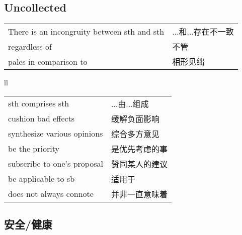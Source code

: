 \subsection{Uncollected}

\begin{tabular}{ll}
    There is an incongruity between sth and sth & ...和...存在不一致 \\
    regardless of                               & 不管           \\
    pales in comparison to                      & 相形见绌         \\
\end{tabular}{ll}

\begin{tabular}{ll}
    sth comprises sth           & ...由...组成 \\
    cushion bad effects         & 缓解负面影响    \\
    synthesize various opinions & 综合多方意见    \\
    be the priority             & 是优先考虑的事   \\
    subscribe to one's proposal & 赞同某人的建议   \\
    be applicable to sb         & 适用于       \\
    does not always connote     & 并非一直意味着   \\
\end{tabular}

\subsection{安全/健康}

